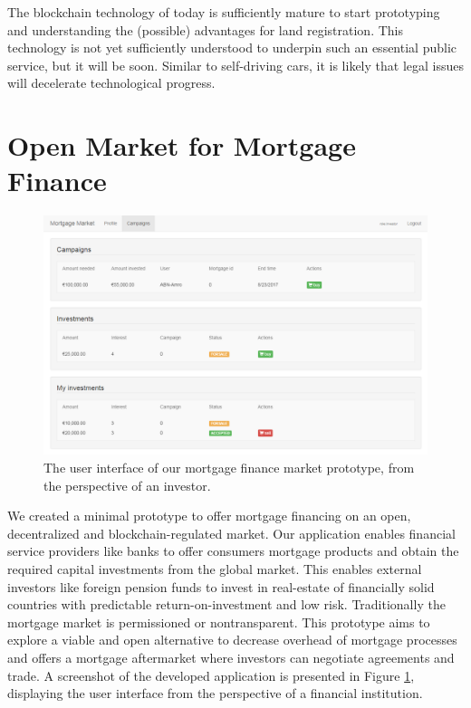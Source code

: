 \documentclass[USenglish]{article}
\begin{document}
The blockchain technology of today is sufficiently mature to start prototyping and understanding the (possible) advantages for land registration. 
This technology is not yet sufficiently understood to underpin such an essential public service, but it will be soon.
Similar to self-driving cars, it is likely that legal issues will decelerate technological progress.

\section{Open Market for Mortgage Finance}

\begin{figure}[t]
	\centering
	\includegraphics[width=1\columnwidth]{assets/mortgagemarket}
	\caption{The user interface of our mortgage finance market prototype, from the perspective of an investor.}
	\label{fig:mortgage_market_interface}
\end{figure}

We created a minimal prototype to offer mortgage financing on an open, decentralized and blockchain-regulated market.
Our application enables financial service providers like banks to offer consumers mortgage products and obtain the required capital investments from the global market.
This enables external investors like foreign pension funds to invest in real-estate of financially solid countries with predictable return-on-investment and low risk.
Traditionally the mortgage market is permissioned or nontransparent.
This prototype aims to explore a viable and open alternative to decrease overhead of mortgage processes and offers a mortgage aftermarket where investors can negotiate agreements and trade.
A screenshot of the developed application is presented in Figure \ref{fig:mortgage_market_interface}, displaying the user interface from the perspective of a financial institution.
\end{document}

